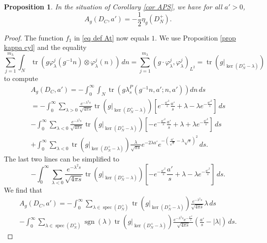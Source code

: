 \documentclass[11pt]{article}
\theoremstyle{plain}
\newtheorem{proposition}[theorem]{Proposition}
\theoremstyle{definition}
\theoremstyle{remark}
\numberwithin{equation}{section}
\DeclareMathOperator{\Tr}{Tr}
\DeclareMathOperator{\tr}{tr}
\DeclareMathOperator{\spec}{spec}
\DeclareMathOperator{\sgn}{sgn}
\begin{document}
\begin{proposition}\label{prop eta g}
In the situation of Corollary \ref{cor APS},
we have for all $a'>0$,
\[
A_{g}(D_C, a') = -\frac{1}{2} \eta_g(D_N^+).
\]
\end{proposition}
\begin{proof}
The function $f_1$ in \eqref{eq def At} now equals $1$. We use Proposition \ref{prop kappa cyl} and the equality
\[
\sum_{j=1}^{m_{\lambda}}
\int_{N} \tr(g\varphi_{\lambda}^j(g^{-1}n) \otimes \varphi_{\lambda}^j(n)) \, dn =
\sum_{j=1}^{m_{\lambda}} (g\cdot \varphi_{\lambda}^j, \varphi_{\lambda}^j)_{L^2} = \tr(g|_{\ker(D_N^+ - \lambda)})
\]
to compute
\begin{multline*}
A_g(D_C, a')%
=-\int_0^{\infty}\int_N
\tr(g\lambda_s^P(g^{-1}n, a'; n, a')) dn\, ds\\
=-\int_0^{\infty}\sum_{\lambda > 0}\frac{e^{-\lambda^2 s}}{\sqrt{4\pi s}}\tr(g|_{\ker(D_N^+ - \lambda)})\left[e^{-\frac{a'^2}{s}}\frac{a'}{s}+\lambda-\lambda e^{-\frac{a'^2}{s}}\right]\,ds \\
-\int_0^{\infty}\sum_{\lambda<0}\frac{e^{-\lambda^2 s}}{\sqrt{4\pi s}}\tr(g|_{\ker(D_N^+ - \lambda)})\left[-e^{-\frac{a'^2}{s}}\frac{a'}{s}+\lambda+\lambda
e^{-\frac{a'^2}{s}}\right] \, ds \\
+\int_0^{\infty}\sum_{\lambda<0}\tr(g|_{\ker(D_N^+ - \lambda)})\frac{\lambda}{\sqrt{\pi s}}e^{-2\lambda a'}e^{-\left(\frac{a'}{\sqrt{s}}-\lambda\sqrt{s}\right)^2}\, ds.
\end{multline*}
The last two lines can be simplified to
\[
-\int_0^{\infty}\sum_{\lambda<0}\frac{e^{-\lambda^2 s}}{\sqrt{4\pi s}}\tr(g|_{\ker(D_N^+ - \lambda)})\left[-e^{-\frac{a'^2}{s}}\frac{a'}{s}+\lambda-\lambda e^{-\frac{a'^2}{s}}\right]\, ds.
\]
We find that
%
\begin{multline} \label{eq Ag cyl 2}
A_{g}(D_C, a')=-\int_0^{\infty}\sum_{\lambda\in \spec(D_N^+)}
\tr(g|_{\ker(D_N^+ - \lambda)})
\frac{e^{-\lambda^2 s}}{\sqrt{4\pi s}}\lambda \, ds\\
-\int_{0}^{\infty}\sum_{\lambda \in \spec(D_N^+)} \sgn(\lambda)\tr(g|_{\ker(D_N^+ - \lambda)})\frac{e^{-\lambda^2 s}e^{-\frac{a'^2}{s}}}{\sqrt{4\pi s}}\left(\frac{a'}{s}-|\lambda|\right)\, ds.

\end{multline}
\end{proof}
\end{document}

